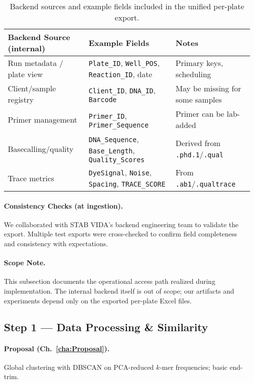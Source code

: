 \begin{table}[H]
\centering
\caption{Backend sources and example fields included in the unified per-plate export.}
\label{tab:backend_sources}
\begin{tabular}{|p{3.6cm}|p{6.7cm}|p{5.1cm}|}
\hline
\textbf{Backend Source (internal)} & \textbf{Example Fields} & \textbf{Notes} \\ \hline
Run metadata / plate view & \texttt{Plate\_ID}, \texttt{Well\_POS}, \texttt{Reaction\_ID}, date & Primary keys, scheduling \\ \hline
Client/sample registry & \texttt{Client\_ID}, \texttt{DNA\_ID}, \texttt{Barcode} & May be missing for some samples \\ \hline
Primer management & \texttt{Primer\_ID}, \texttt{Primer\_Sequence} & Primer can be lab-added \\ \hline
Basecalling/quality & \texttt{DNA\_Sequence}, \texttt{Base\_Length}, \texttt{Quality\_Scores} & Derived from \texttt{.phd.1}/\texttt{.qual} \\ \hline
Trace metrics & \texttt{DyeSignal}, \texttt{Noise}, \texttt{Spacing}, \texttt{TRACE\_SCORE} & From \texttt{.ab1}/\texttt{.qualtrace} \\ \hline
\end{tabular}
\end{table}

\paragraph{Consistency Checks (at ingestion).}
We collaborated with STAB VIDA’s backend engineering team to validate the export. Multiple test exports were cross-checked to confirm field completeness and consistency with expectations.

\paragraph{Scope Note.}
This subsection documents the operational access path realized during implementation. The internal backend itself is out of scope; our artifacts and experiments depend only on the exported per-plate Excel files.


\subsection*{Step 1 — Data Processing \& Similarity}
\paragraph{Proposal (Ch.~\ref{cha:Proposal}).}
Global clustering with DBSCAN on PCA-reduced $k$-mer frequencies; basic end-trim.

